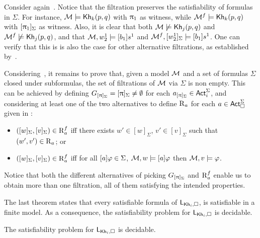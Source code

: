 \medskip 

\begin{example}\label{ex:filtration-preserves}
 Consider again~. Notice that the filtration preserves the satisfiability of formulas in $\Sigma$. For instance, $\mathcal{M}\models{\sf Kh}_k(p,q)$ with $\uppi_1$ as witness, while $\mathcal{M}^f\models{\sf Kh}_k(p,q)$ with $[\uppi_1]_\Sigma$ as witness. Also, it is clear that both $\mathcal{M}\not\models{\sf Kh}_j(p,q)$ and $\mathcal{M}^f\not\models{\sf Kh}_j(p,q)$, and that $\mathcal{M},w^1_2\models[b_1] s^1$ and $\mathcal{M}^f,[w^1_2]_\Sigma\models[b_1] s^1$. One can verify that this is is also the case for other alternative filtrations, as established by~.
\end{example}

\medskip

Considering~, it remains to prove that, given a model $\mathcal{M}$ and a set of formulas $\Sigma$ closed under subformulas, the set of filtrations of $\mathcal{M}$ via $\Sigma$ is non empty.
This can be achieved by defining $G_{[\uppi]_\Sigma} = [\uppi]_\Sigma \neq \emptyset$ for each $a_{[\uppi]_\Sigma} \in {\rm \sf Act}^\Sigma_i$, and considering at least one of the two alternatives to define $\operatorname{R}_a$ for each $a \in {\rm \sf Act}^\Sigma_\square$ given in \cite{HML,mlbook}:

\begin{itemize}
\item $([w]_\Sigma,[v]_\Sigma) \in \operatorname{R}^f_a$ iff there exists $w' \in [w]_\Sigma$, $v' \in [v]_\Sigma$ such that $(w',v') \in \operatorname{R}_a$; or
\item $([w]_\Sigma,[v]_\Sigma) \in \operatorname{R}^f_a$ iff for all $[a]\varphi \in \Sigma$, $\mathcal{M},w \models [a]\varphi$ then $\mathcal{M},v \models \varphi$.
\end{itemize}

Notice that both the different alternatives of picking $G_{[\uppi]_\Sigma}$ and $\operatorname{R}^f_a$ enable us to obtain more than one filtration, all of them satisfying the intended properties.

\medskip

The last theorem states that every satisfiable formula of $\mathsf{L}_{{\sf Kh}_i,\square}$, is satisfiable in a finite model.
As a consequence, the satisfiability problem for $\mathsf{L}_{{\sf Kh}_i,\square}$ is decidable.

\medskip

\begin{corollary}\label{cor:extended-decidable}
The satisfiability problem for $\mathsf{L}_{{\sf Kh}_i,\square}$ is decidable.
\end{corollary}

